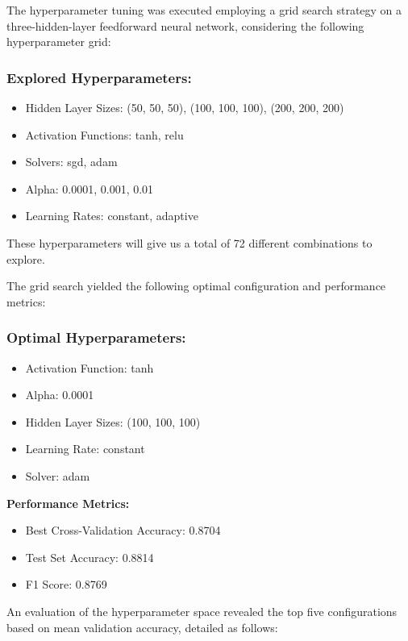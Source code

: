 \documentclass{article}
\begin{document}
The hyperparameter tuning was executed employing a grid search strategy on a three-hidden-layer feedforward neural network, considering the following hyperparameter grid:

\subsubsection*{Explored Hyperparameters:}
\begin{itemize}
    \item Hidden Layer Sizes: (50, 50, 50), (100, 100, 100), (200, 200, 200)
    \item Activation Functions: tanh, relu
    \item Solvers: sgd, adam
    \item Alpha: 0.0001, 0.001, 0.01
    \item Learning Rates: constant, adaptive
\end{itemize}

These hyperparameters will give us a total of 72 different combinations to explore. 

The grid search yielded the following optimal configuration and performance metrics:

\subsubsection*{Optimal Hyperparameters:}
\begin{itemize}
    \item Activation Function: tanh
    \item Alpha: 0.0001
    \item Hidden Layer Sizes: (100, 100, 100)
    \item Learning Rate: constant
    \item Solver: adam
\end{itemize}

\textbf{Performance Metrics:}
\begin{itemize}
    \item Best Cross-Validation Accuracy: 0.8704
    \item Test Set Accuracy: 0.8814
    \item F1 Score: 0.8769
\end{itemize}

An evaluation of the hyperparameter space revealed the top five configurations based on mean validation accuracy, detailed as follows:
\end{document}
